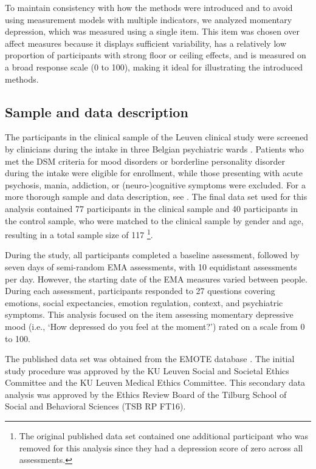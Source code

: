 \documentclass[man, floatsintext]{apa7}
\begin{document}
To maintain consistency with how the methods were introduced and to avoid using
measurement models with multiple indicators, we analyzed momentary depression,
which was measured using a single item. This item was chosen over affect
measures because it displays sufficient variability, has a relatively low
proportion of participants with strong floor or ceiling effects, and is
measured on a broad response scale (0 to 100), making it ideal for illustrating
the introduced methods.

\subsection{Sample and data description}

The participants in the clinical sample of the Leuven clinical study were
screened by clinicians during the intake in three Belgian psychiatric wards
\parencite{heininga_dynamical_2019}. Patients who met the DSM criteria for mood
disorders or borderline personality disorder during the intake were eligible
for enrollment, while those presenting with acute psychosis, mania, addiction,
or (neuro-)cognitive symptoms were excluded. For a more thorough sample and
data description, see \textcite{heininga_dynamical_2019}. The final data set
used for this analysis contained 77 participants in the clinical sample and 40
participants in the control sample, who were matched to the clinical sample by
gender and age, resulting in a total sample size of 117 \footnote{The original
  published data set contained one additional participant who was removed for
  this analysis since they had a depression score of zero across all
  assessments.}.

During the study, all participants completed a baseline assessment, followed by
seven days of semi-random EMA assessments, with 10 equidistant assessments per
day. However, the starting date of the EMA measures varied between people.
During each assessment, participants responded to 27 questions covering
emotions, social expectancies, emotion regulation, context, and psychiatric
symptoms. This analysis focused on the item assessing momentary depressive mood
(i.e., `How depressed do you feel at the moment?') rated on a scale from 0 to
100.

The published data set was obtained from the EMOTE database
\parencite{kalokerinos_emote_nodate}. The initial study procedure was approved
by the KU Leuven Social and Societal Ethics Committee and the KU Leuven Medical
Ethics Committee. This secondary data analysis was approved by the Ethics
Review Board of the Tilburg School of Social and Behavioral Sciences (TSB RP
FT16).
\end{document}
